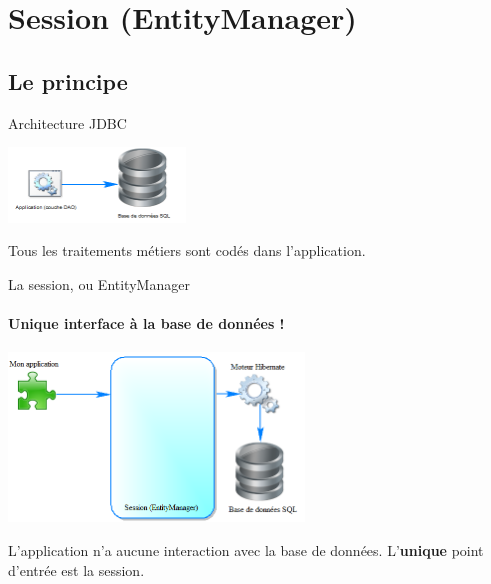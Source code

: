 \documentclass[compact]{beamer}%
\begin{document}
\section{Session (EntityManager)}

\subsection{Le principe}

\begin{frame}{Architecture JDBC}
	
	\begin{center}
	\includegraphics[height=2cm]{images/without_orm.png}	
	\end{center}
	
	\begin{block}{}
	\center
	Tous les traitements métiers sont codés dans l'application.
	\end{block}
\end{frame}
	
\begin{frame}{La session, ou EntityManager}
	\framesubtitle{Unique interface à la base de données !}
	
	\begin{center}
	\includegraphics[height=4.5cm]{images/with_orm_empty.png}	
	\end{center}
	
	\begin{block}{}
	\center
	L'application n'a aucune interaction avec la base de données. L'\textbf{unique} point d'entrée est la session.
	\end{block}
\end{frame}
\end{document}
